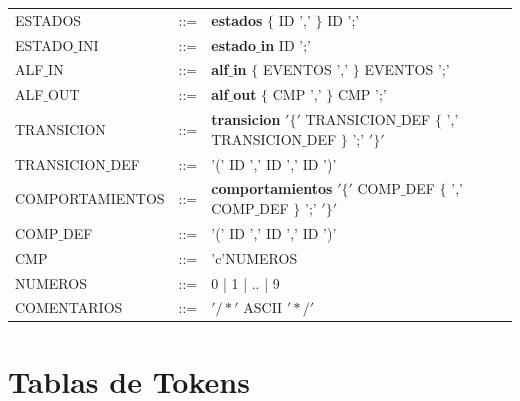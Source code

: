 \documentclass[12pt,a4paper]{article}
\begin{document}
{\begin{center}
\begin{tabular}{lcl}
				ESTADOS	& ::= &   \textbf{estados} $\{$ ID ',' $\}$ ID ';'\\ 
				
				 ESTADO$\_$INI &::= & \textbf{estado$\_$in} ID ';'\\ 
				 
				ALF$\_$IN &::= & \textbf{alf$\_$in}  $\{$ EVENTOS ',' $\}$ EVENTOS ';' \\ 
				
				ALF$\_$OUT & ::= &\textbf{alf$\_$out}  $\{$ CMP ',' $\}$ CMP ';'  \\ 
				
				TRANSICION 	 & ::= & \textbf{transicion} $'\{'$ TRANSICION$\_$DEF $\{$ ',' TRANSICION$\_$DEF  $\}$ ';' $'\}'$ \\ 
				
				TRANSICION$\_$DEF & ::= & '(' ID ',' ID ',' ID ')' \\ 
			
				
				COMPORTAMIENTOS	 & ::= &  \textbf{comportamientos} $'\{'$ COMP$\_$DEF $\{$ ',' COMP$\_$DEF $\}$ ';' $'\}'$\\ 
				
				COMP$\_$DEF &  ::= & '(' ID ',' ID ',' ID ')' \\ 
				
				
				CMP  & ::= & 'c'NUMEROS \\ 
				
				NUMEROS &::= & 0 | 1 | .. | 9 \\ 
				
				COMENTARIOS & ::=  & $'/\ast'$ ASCII $'\ast/'$ \\
				
				
			\end{tabular} 	
		\end{center}
	
	
	
	

	\newpage
	\section{Tablas de Tokens}
		
}
\end{document}

